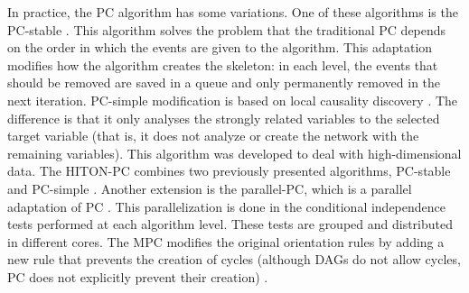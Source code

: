 In practice, the PC algorithm has some variations. One of these algorithms is the PC-stable \cite{colombo2014order}. This algorithm solves the problem that the traditional PC depends on the order in which the events are given to the algorithm. This adaptation modifies how the algorithm creates the skeleton: in each level, the events that should be removed are saved in a queue and only permanently removed in the next iteration. PC-simple modification is based on local causality discovery \cite{buhlmann2010variable}. The difference is that it only analyses the strongly related variables to the selected target variable (that is, it does not analyze or create the network with the remaining variables). This algorithm was developed to deal with high-dimensional data. The HITON-PC combines two previously presented algorithms, PC-stable and PC-simple \cite{aliferis2003hiton}. Another extension is the parallel-PC, which is a parallel adaptation of PC \cite{le2016fast}. This parallelization is done in the conditional independence tests performed at each algorithm level. These tests are grouped and distributed in different cores. The MPC modifies the original orientation rules by adding a new rule that prevents the creation of cycles (although DAGs do not allow cycles, PC does not explicitly prevent their creation) \cite{tsagris2019bayesian}.

